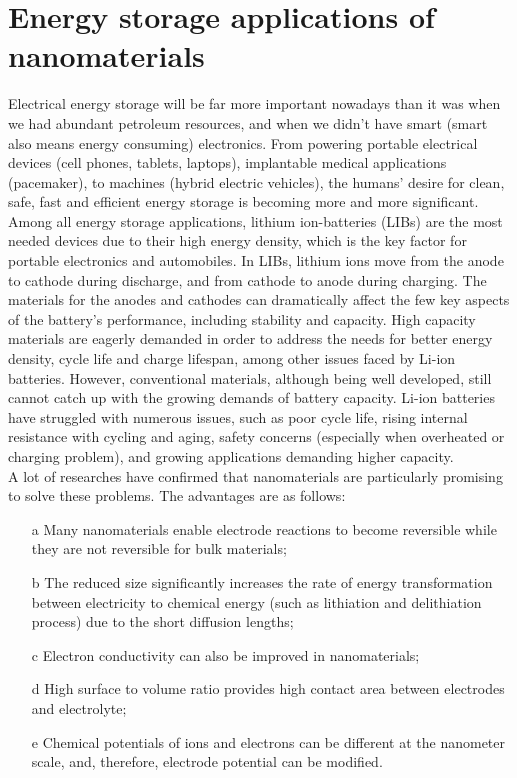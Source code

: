 \section{Energy storage applications of nanomaterials}
Electrical energy storage will be far more important nowadays than it was when we had abundant petroleum resources, and when we didn't have smart (smart also means energy consuming) electronics. From powering portable electrical devices (cell phones, tablets, laptops), implantable medical applications (pacemaker), to machines (hybrid electric vehicles), the humans' desire for clean, safe, fast and efficient energy storage is becoming more and more  significant. \\
Among all energy storage applications, lithium ion-batteries (LIBs) are the most needed devices due to their high energy density, which is the key factor for portable electronics and automobiles. In LIBs, lithium ions move from the anode to cathode during discharge, and from cathode to anode during charging. The materials for the anodes and cathodes can dramatically affect the few key aspects of the battery’s performance, including stability and capacity. High capacity materials are eagerly demanded in order to address the needs for better energy density, cycle life and charge lifespan, among other issues faced by Li-ion batteries. 
However, conventional materials, although being  well developed,  still cannot catch up with the growing demands of battery capacity. Li-ion batteries have struggled with numerous issues, such as poor cycle life, rising internal resistance with cycling and aging, safety concerns (especially when overheated or charging problem), and growing applications demanding higher capacity. \\
A lot of researches have confirmed that nanomaterials are particularly promising to solve these problems. The advantages are as follows\cite{Bruce2008,qifengzhang2013csr}: \\
\begin{itemize}
	\item[a] Many nanomaterials enable electrode reactions to become reversible while they are not reversible for bulk materials; 
	\item[b] The reduced size significantly increases the rate of energy transformation between electricity to chemical energy (such as lithiation and delithiation process) due to the short diffusion lengths; 
	\item[c] Electron conductivity can also be improved in nanomaterials; 
	\item[d] High surface to volume ratio provides high contact area between electrodes and electrolyte; 
	\item[e] Chemical potentials of ions and electrons can be different at the nanometer scale, and, therefore, electrode potential can be modified. 
\end{itemize}

